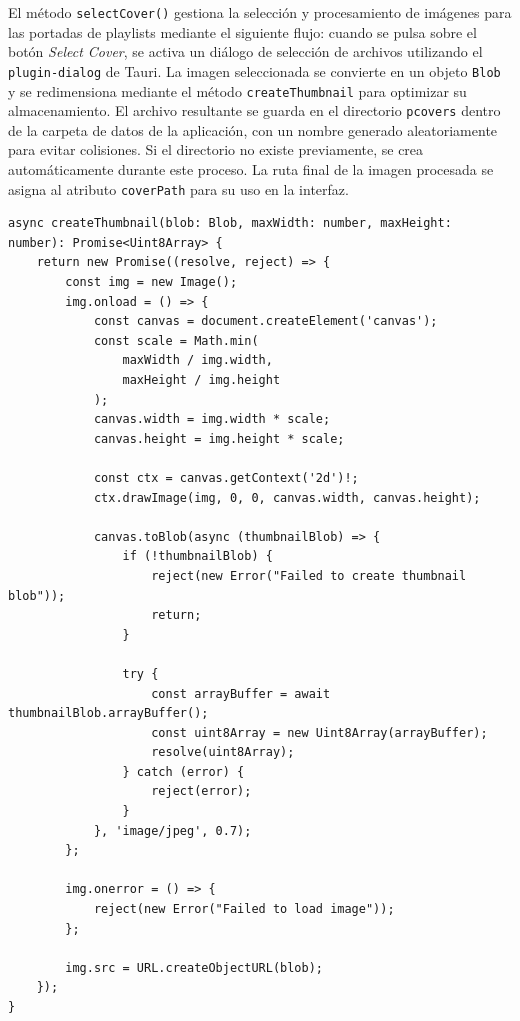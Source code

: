 \documentclass[11pt, a4paper]{article}
\begin{document}
                
                El método \texttt{selectCover()} gestiona la selección y procesamiento de imágenes para las portadas de playlists mediante el siguiente flujo: cuando se pulsa sobre el botón \textit{Select Cover}, se activa un diálogo de selección de archivos utilizando el \texttt{plugin-dialog} de Tauri. La imagen seleccionada se convierte en un objeto \texttt{Blob} y se redimensiona mediante el método \texttt{createThumbnail} para optimizar su almacenamiento. El archivo resultante se guarda en el directorio \texttt{pcovers} dentro de la carpeta de datos de la aplicación, con un nombre generado aleatoriamente para evitar colisiones. Si el directorio no existe previamente, se crea automáticamente durante este proceso. La ruta final de la imagen procesada se asigna al atributo \texttt{coverPath} para su uso en la interfaz.

                \begin{lstlisting}[caption={createThumbnail()}]
async createThumbnail(blob: Blob, maxWidth: number, maxHeight: number): Promise<Uint8Array> {
    return new Promise((resolve, reject) => {
        const img = new Image();
        img.onload = () => {
            const canvas = document.createElement('canvas');
            const scale = Math.min(
                maxWidth / img.width,
                maxHeight / img.height
            );
            canvas.width = img.width * scale;
            canvas.height = img.height * scale;
            
            const ctx = canvas.getContext('2d')!;
            ctx.drawImage(img, 0, 0, canvas.width, canvas.height);
            
            canvas.toBlob(async (thumbnailBlob) => {
                if (!thumbnailBlob) {
                    reject(new Error("Failed to create thumbnail blob"));
                    return;
                }
                
                try {
                    const arrayBuffer = await thumbnailBlob.arrayBuffer();
                    const uint8Array = new Uint8Array(arrayBuffer);
                    resolve(uint8Array);
                } catch (error) {
                    reject(error);
                }
            }, 'image/jpeg', 0.7);
        };
        
        img.onerror = () => {
            reject(new Error("Failed to load image"));
        };
        
        img.src = URL.createObjectURL(blob);
    });
}
                \end{lstlisting}
\end{document}
